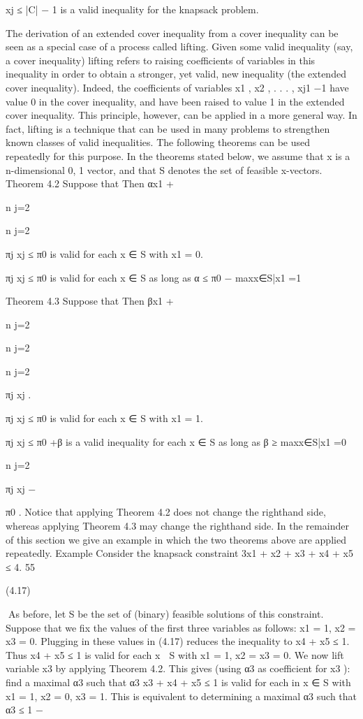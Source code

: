 xj ≤ |C| − 1 is a valid inequality for the knapsack problem.

The derivation of an extended cover inequality from a cover inequality can be seen as a special case
of a process called lifting. Given some valid inequality (say, a cover inequality) lifting refers to raising
coefficients of variables in this inequality in order to obtain a stronger, yet valid, new inequality (the
extended cover inequality). Indeed, the coefficients of variables x1 , x2 , . . . , xj1 −1 have value 0 in the cover
inequality, and have been raised to value 1 in the extended cover inequality. This principle, however, can
be applied in a more general way. In fact, lifting is a technique that can be used in many problems to
strengthen known classes of valid inequalities. The following theorems can be used repeatedly for this
purpose. In the theorems stated below, we assume that x is a n-dimensional {0, 1} vector, and that S
denotes the set of feasible x-vectors.
Theorem 4.2 Suppose that
Then αx1 +

n
j=2

n
j=2

πj xj ≤ π0 is valid for each x ∈ S with x1 = 0.

πj xj ≤ π0 is valid for each x ∈ S as long as α ≤ π0 − maxx∈S|x1 =1

Theorem 4.3 Suppose that
Then βx1 +

n
j=2

n
j=2

n
j=2

πj xj .

πj xj ≤ π0 is valid for each x ∈ S with x1 = 1.

πj xj ≤ π0 +β is a valid inequality for each x ∈ S as long as β ≥ maxx∈S|x1 =0

n
j=2

πj xj −

π0 .
Notice that applying Theorem 4.2 does not change the righthand side, whereas applying Theorem 4.3
may change the righthand side. In the remainder of this section we give an example in which the two
theorems above are applied repeatedly.
Example Consider the knapsack constraint
3x1 + x2 + x3 + x4 + x5 ≤ 4.
55

(4.17)

As before, let S be the set of (binary) feasible solutions of this constraint. Suppose that we fix the values
of the first three variables as follows:
x1 = 1, x2 = x3 = 0.
Plugging in these values in (4.17) reduces the inequality to x4 + x5 ≤ 1. Thus x4 + x5 ≤ 1 is valid for
each x ∈ S with x1 = 1, x2 = x3 = 0.
We now lift variable x3 by applying Theorem 4.2. This gives (using α3 as coefficient for x3 ): find a
maximal α3 such that α3 x3 + x4 + x5 ≤ 1 is valid for each in x ∈ S with x1 = 1, x2 = 0, x3 = 1. This is
equivalent to determining a maximal α3 such that
α3 ≤ 1 −


